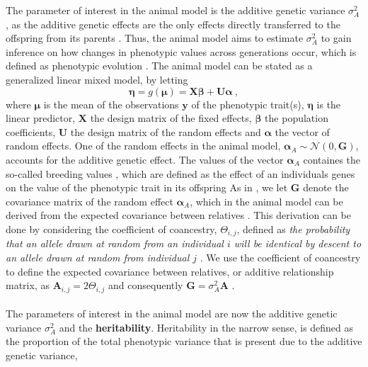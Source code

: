 The parameter of interest in the animal model is the additive genetic variance $\sigma^2_A$ \citep{Kruuk2004}, as the additive genetic effects are the only effects directly transferred to the offspring from its parents \citep{ConnerHartl2004}.
Thus, the animal model aims to estimate $\sigma^2_A$ to gain inference on how changes in phenotypic values across generations occur, which is defined as phenotypic evolution \citep{ConnerHartl2004}.
The animal model can be stated as a generalized linear mixed model, by letting 
\begin{equation}
    \boldsymbol{\eta} = g(\boldsymbol{\mu}) = \mathbf{X}\boldsymbol{\beta} + \mathbf{U}\boldsymbol{\alpha}\ ,
\end{equation}
where $\boldsymbol{\mu}$ is the mean of the observations $\mathbf{y}$ of the phenotypic trait(s), $\boldsymbol{\eta}$ is the linear predictor, $\mathbf{X}$ the design matrix of the fixed effects, $\boldsymbol{\beta}$ the population coefficients, $\mathbf{U}$ the design matrix of the random effects and $\boldsymbol{\alpha}$ the vector of random effects.
One of the random effects in the animal model, $\boldsymbol{\alpha}_A \sim \mathcal{N}(0, \mathbf{G})$,  accounts for the additive genetic effect. The values of the vector $\boldsymbol{\alpha}_A$ containes the so-called breeding values \citet{Wilson_guide_animal_model}, which are defined as the effect of an individuals genes on the value of the phenotypic trait in its offspring \citep{ConnerHartl2004} 
As in , we let $\mathbf{G}$ denote the covariance matrix of the random effect $\boldsymbol{\alpha}_A$, which in the animal model can be derived from the expected covariance between relatives \citep{Kruuk2004}.
This derivation can be done by considering the coefficient of coancestry, $\Theta_{i,j}$, defined as \textit{the probability that an allele drawn at random from an individual $i$ will be identical by descent to an allele drawn at random from individual $j$} \citep{Kruuk2004}. 
We use the coefficient of coancestry to define the expected covariance between relatives, or additive relationship matrix, as $\mathbf{A}_{i, j}=2\Theta_{i, j}$ and consequently $\mathbf{G}=\sigma^2_A\mathbf{A}$ \citep{Kruuk2004}. 
\\
\\
The parameters of interest in the animal model are now the additive genetic variance $\sigma^2_A$ and the \textbf{heritability}. Heritability in the narrow sense, is defined as \citep{Wilson2008} the proportion of the total phenotypic variance that is present due to the additive genetic variance, 
